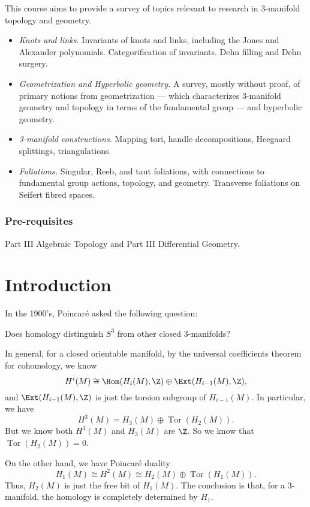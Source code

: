 \documentclass[a4paper]{article}
\DeclareMathOperator\Tor{Tor}
\begin{document}
\maketitle
{\small
\setlength{\parindent}{0em}
\setlength{\parskip}{1em}
This course aims to provide a survey of topics relevant to research in 3-manifold topology and geometry.
\begin{itemize}
 \item \textit{Knots and links.} Invariants of knots and links, including the Jones and Alexander polynomials. Categorification of invariants. Dehn filling and Dehn surgery.
 \item \textit{Geometrization and Hyperbolic geometry.} A survey, mostly without proof, of primary notions from geometrization --- which characterizes 3-manifold geometry and topology in terms of the fundamental group --- and hyperbolic geometry.
 \item \textit{3-manifold constructions.} Mapping tori, handle decompositions, Heegaard splittings, triangulations.
 \item \textit{Foliations.} Singular, Reeb, and taut foliations, with connections to fundamental group actions, topology, and geometry. Transverse foliations on Seifert fibred spaces.
\end{itemize}
\subsubsection*{Pre-requisites}
Part III Algebraic Topology and Part III Differential Geometry.
}
\tableofcontents

\section{Introduction}
In the 1900's, Poincar\'e asked the following question:
\begin{center}
  Does homology distinguish $S^3$ from other closed $3$-manifolds?
\end{center}
In general, for a closed orientable manifold, by the universal coefficients theorem for cohomology, we know
\[
  H^i(M) \cong \Hom(H_i(M), \Z) \oplus \Ext(H_{i - 1}(M), \Z),
\]
and $\Ext(H_{i - 1}(M), \Z)$ is just the torsion subgroup of $H_{i - 1}(M)$. In particular, we have
\[
  H^3(M) = H_3(M) \oplus \Tor(H_2(M)).
\]
But we know both $H^3(M)$ and $H_3(M)$ are $\Z$. So we know that $\Tor(H_2(M)) = 0$.

On the other hand, we have Poincar\'e duality
\[
  H_1(M) \cong H^2(M) \cong H_2(M) \oplus \Tor(H_1(M)).
\]
Thus, $H_2(M)$ is just the free bit of $H_1(M)$. The conclusion is that, for a $3$-manifold, the homology is completely determined by $H_1$.
\end{document}
